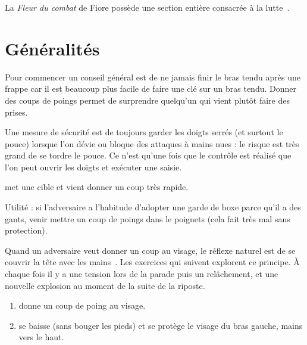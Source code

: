 La \emph{Fleur du combat} de Fiore possède une section entière consacrée à la lutte~\cite{deiLiberi:Conan:2013:FleurCombat:Lutte}.


\section{Généralités}


Pour commencer un conseil général est de ne jamais finir le bras tendu après une frappe car il est beaucoup plus facile de faire une clé sur un bras tendu.
Donner des coups de poings permet de surprendre quelqu'un qui vient plutôt faire des prises.

Une mesure de sécurité est de toujours garder les doigts serrés (et surtout le pouce) lorsque l'on dévie ou bloque des attaques à mains nues : le risque est très grand de se tordre le pouce.
Ce n'est qu'une fois que le contrôle est réalisé que l'on peut ouvrir les doigts et exécuter une saisie.


\begin{exercice}

\A met une cible et \D vient donner un coup très rapide.

Utilité : si l'adversaire a l'habitude d'adopter une garde de boxe parce qu'il a des gants, venir mettre un coup de poings dans le poignets (cela fait très mal sans protection).

\end{exercice}


Quand un adversaire veut donner un coup au visage, le réflexe naturel est de se couvrir la tête avec les mains~\cite{enzi:dijon:messer_inner:2015}.
Les exercices qui suivent explorent ce principe.
À chaque fois il y a une tension lors de la parade puis un relâchement, et une nouvelle explosion au moment de la suite de la riposte.


\begin{exercice}
\label{mains-nues:ex:enzi-1}

\begin{enumerate}
	\item \A donne un coup de poing au visage.
	\item \D se baisse (sans bouger les pieds) et se protège le visage du bras gauche, mains vers le haut.
\end{enumerate}

\end{exercice}


